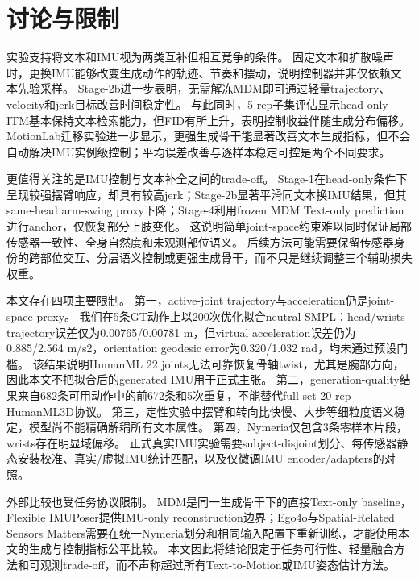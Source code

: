 \section{讨论与限制}
\label{sec:5_discussion}


实验支持将文本和IMU视为两类互补但相互竞争的条件。
固定文本和扩散噪声时，更换IMU能够改变生成动作的轨迹、节奏和摆动，说明控制器并非仅依赖文本先验采样。
Stage-2b进一步表明，无需解冻MDM即可通过轻量trajectory、velocity和jerk目标改善时间稳定性。
与此同时，5-rep子集评估显示head-only ITM基本保持文本检索能力，但FID有所上升，表明控制收益伴随生成分布偏移。
MotionLab迁移实验进一步显示，更强生成骨干能显著改善文本生成指标，但不会自动解决IMU实例级控制；平均误差改善与逐样本稳定可控是两个不同要求。

更值得关注的是IMU控制与文本补全之间的trade-off。
Stage-1在head-only条件下呈现较强摆臂响应，却具有较高jerk；Stage-2b显著平滑同文本换IMU结果，但其same-head arm-swing proxy下降；Stage-4利用frozen MDM Text-only prediction进行anchor，仅恢复部分上肢变化。
这说明简单joint-space约束难以同时保证局部传感器一致性、全身自然度和未观测部位语义。
后续方法可能需要保留传感器身份的跨部位交互、分层语义控制或更强生成骨干，而不只是继续调整三个辅助损失权重。

本文存在四项主要限制。
第一，active-joint trajectory与acceleration仍是joint-space proxy。
我们在5条GT动作上以200次优化拟合neutral SMPL：head/wrists trajectory误差仅为0.00765/0.00781 m，但virtual acceleration误差仍为0.885/2.564 m/s2，orientation geodesic error为0.320/1.032 rad，均未通过预设门槛。
该结果说明HumanML 22 joints无法可靠恢复骨轴twist，尤其是腕部方向，因此本文不把拟合后的generated IMU用于正式主张。
第二，generation-quality结果来自682条可用动作中的前672条和5次重复，不能替代full-set 20-rep HumanML3D协议。
第三，定性实验中摆臂和转向比快慢、大步等细粒度语义稳定，模型尚不能精确解耦所有文本属性。
第四，Nymeria仅包含3条零样本片段，wrists存在明显域偏移。
正式真实IMU实验需要subject-disjoint划分、每传感器静态安装校准、真实/虚拟IMU统计匹配，以及仅微调IMU encoder/adapters的对照。

外部比较也受任务协议限制。
MDM是同一生成骨干下的直接Text-only baseline，Flexible IMUPoser提供IMU-only reconstruction边界；Ego4o与Spatial-Related Sensors Matters需要在统一Nymeria划分和相同输入配置下重新训练，才能使用本文的生成与控制指标公平比较。
本文因此将结论限定于任务可行性、轻量融合方法和可观测trade-off，而不声称超过所有Text-to-Motion或IMU姿态估计方法。
